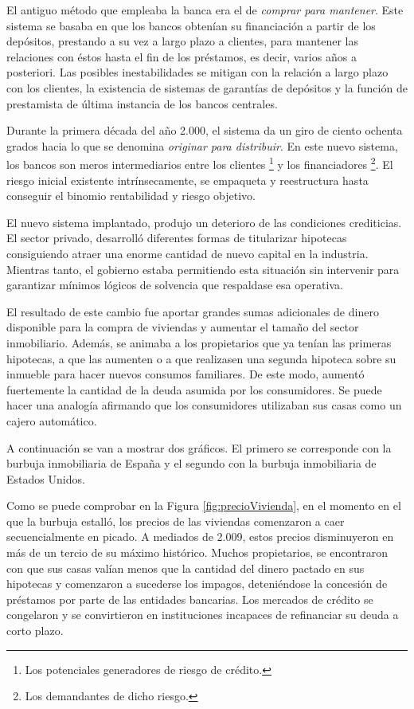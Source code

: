El antiguo método que empleaba la banca era el de \emph{comprar para mantener}. Este sistema se basaba en que los bancos obtenían su financiación a partir de los depósitos, prestando a su vez a largo plazo a clientes, para mantener las relaciones con éstos hasta el fin de los préstamos, es decir, varios años a posteriori. Las posibles inestabilidades se mitigan con la relación a largo plazo con los clientes, la existencia de sistemas de garantías de depósitos y la función de prestamista de última instancia de los bancos centrales.

Durante la primera década del año 2.000, el sistema da un giro de ciento ochenta grados hacia lo que se denomina \emph{originar para distribuir}. En este nuevo sistema, los bancos son meros intermediarios entre los clientes \footnote{Los potenciales generadores de riesgo de crédito.} y los financiadores \footnote{Los demandantes de dicho riesgo.}. El riesgo inicial existente intrínsecamente, se empaqueta y reestructura hasta conseguir el binomio rentabilidad y riesgo objetivo.

El nuevo sistema implantado, produjo un deterioro de las condiciones crediticias. El sector privado, desarrolló diferentes formas de titularizar hipotecas consiguiendo atraer una enorme cantidad de nuevo capital en la industria. Mientras tanto, el gobierno estaba permitiendo esta situación sin intervenir para garantizar mínimos lógicos de solvencia que respaldase esa operativa. 

El resultado de este cambio fue aportar grandes sumas adicionales de dinero disponible para la compra de viviendas y aumentar el tamaño del sector inmobiliario. Además, se animaba a los propietarios que ya tenían las primeras hipotecas, a que las aumenten o a que realizasen una segunda hipoteca sobre su inmueble para hacer nuevos consumos familiares. De este modo, aumentó fuertemente la cantidad de la deuda asumida por los consumidores. Se puede hacer una analogía afirmando que los consumidores utilizaban sus casas como un cajero automático.

A continuación se van a mostrar dos gráficos. El primero se corresponde con la burbuja inmobiliaria de España y el segundo con la burbuja inmobiliaria de Estados Unidos.

Como se puede comprobar en la Figura \ref{fig:precioVivienda}, en el momento en el que la burbuja estalló, los precios de las viviendas comenzaron a caer secuencialmente en picado. A mediados de 2.009, estos precios disminuyeron en más de un tercio de su máximo histórico. Muchos propietarios, se encontraron con que sus casas valían menos que la cantidad del dinero pactado en sus hipotecas y comenzaron a sucederse los impagos, deteniéndose la concesión de préstamos por parte de las entidades bancarias. Los mercados de crédito se congelaron y se convirtieron en instituciones incapaces de refinanciar su deuda a corto plazo.

